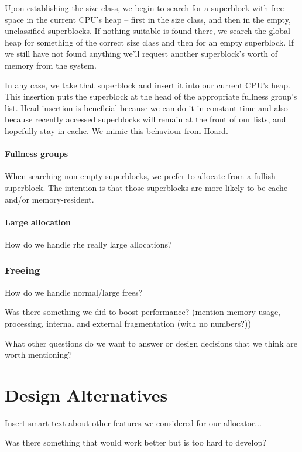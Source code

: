 \documentclass{article}
\begin{document}
Upon establishing the size class, we begin to search for a superblock with
free space in the current CPU's heap -- first in the size class, and then in the
empty, unclassified superblocks. If nothing suitable is found there, we search
the global heap for something of the correct size class and then for an empty
superblock. If we still have not found anything we'll request another
superblock's worth of memory from the system.

In any case, we take that superblock and insert it into our current CPU's heap.
This insertion puts the superblock at the head of the appropriate fullness
group's list. Head insertion is beneficial because we can do it in constant
time and also because recently accessed superblocks will remain at the front
of our lists, and hopefully stay in cache. We mimic this behaviour from Hoard.

\paragraph{Fullness groups}
When searching non-empty superblocks, we prefer to allocate from a fullish
superblock. The intention is that those superblocks are more likely to be 
cache- and/or memory-resident.

\paragraph{Large allocation}
How do we handle rhe really large allocations?

\subsubsection{Freeing}
How do we handle normal/large frees?

Was there something we did to boost performance? (mention memory usage, 
processing, internal and external fragmentation (with no numbers?))

What other questions do we want to answer or design decisions that we think
are worth mentioning?

\newpage
\section{Design Alternatives}

Insert smart text about other features we considered for our allocator...

Was there something that would work better but is too hard to develop?
\end{document}
